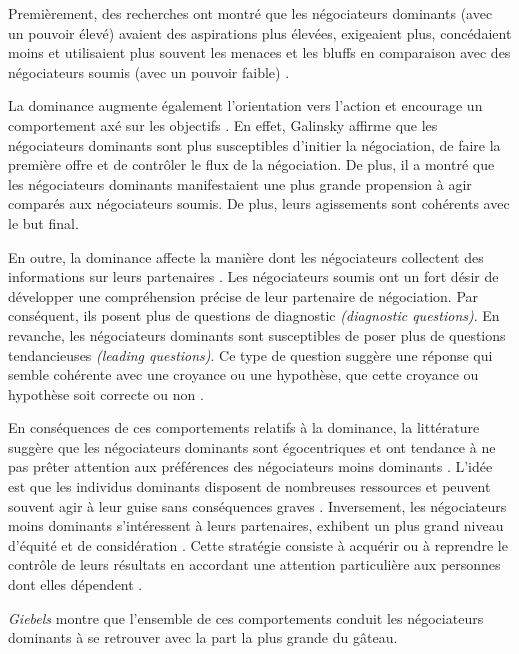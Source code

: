 	Premièrement, des recherches ont montré que les négociateurs dominants (avec un pouvoir élevé) avaient des aspirations plus élevées, exigeaient plus, concédaient moins et utilisaient plus souvent les menaces et les bluffs en comparaison avec des négociateurs soumis (avec un pouvoir faible) \cite{de1995impact}.
	
	
	 La dominance augmente également l'orientation vers l'action et encourage un comportement axé sur les objectifs \cite{van2006power}. En effet, Galinsky \cite{galinsky2003power} affirme que les négociateurs dominants sont plus susceptibles d'initier la négociation, de faire la première offre et de contrôler le flux de la négociation.  De plus, il a montré que les négociateurs dominants manifestaient une plus grande propension à agir comparés aux négociateurs soumis. De plus, leurs agissements sont cohérents avec le but final.
	 
	 
	 En outre, la dominance affecte la manière dont les négociateurs collectent des informations sur leurs partenaires \cite{de2004influence}. Les négociateurs soumis ont un fort désir de développer une compréhension précise de leur partenaire de négociation. Par conséquent, ils posent plus de questions de diagnostic \emph {(diagnostic questions)}.
	 En revanche, les négociateurs dominants sont susceptibles de poser plus de questions tendancieuses \emph {(leading questions)}. Ce type de question suggère une réponse qui semble cohérente avec une croyance ou une hypothèse, que cette croyance ou hypothèse soit correcte ou non \cite{galinsky2003power}.
	
	En conséquences de ces comportements relatifs à la dominance, la littérature suggère que les négociateurs dominants sont égocentriques et ont tendance à ne pas prêter attention aux préférences des négociateurs moins dominants  \cite{fiske1993controlling, de1995impact}. L'idée est que les individus dominants disposent de nombreuses ressources et peuvent souvent agir à leur guise sans conséquences graves \cite{van2006power}. Inversement, les négociateurs moins dominants s'intéressent à leurs partenaires, exhibent un plus grand niveau d'équité et de considération \cite{de1995impact}. Cette stratégie consiste à acquérir ou à reprendre le contrôle de leurs résultats en accordant une attention particulière aux personnes dont elles dépendent \cite{fiske1993controlling}.
	
	\emph{Giebels} \cite{giebels2000interdependence} montre que l'ensemble de ces comportements conduit les négociateurs dominants à se retrouver avec la part la plus grande du gâteau.
	

